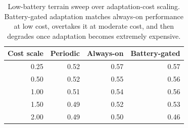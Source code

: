 \begin{table}[t]
\centering
\caption{Low-battery terrain sweep over adaptation-cost scaling. Battery-gated adaptation matches always-on performance at low cost, overtakes it at moderate cost, and then degrades once adaptation becomes extremely expensive.}
\label{tab:cost-sweep}
\small
\begin{tabular}{rrrr}
\toprule
Cost scale & Periodic & Always-on & Battery-gated \\
\midrule
0.25 & 0.52 & 0.57 & 0.57 \\
0.50 & 0.52 & 0.55 & 0.56 \\
1.00 & 0.51 & 0.54 & 0.56 \\
1.50 & 0.49 & 0.52 & 0.53 \\
2.00 & 0.49 & 0.50 & 0.46 \\
\bottomrule
\end{tabular}
\end{table}
